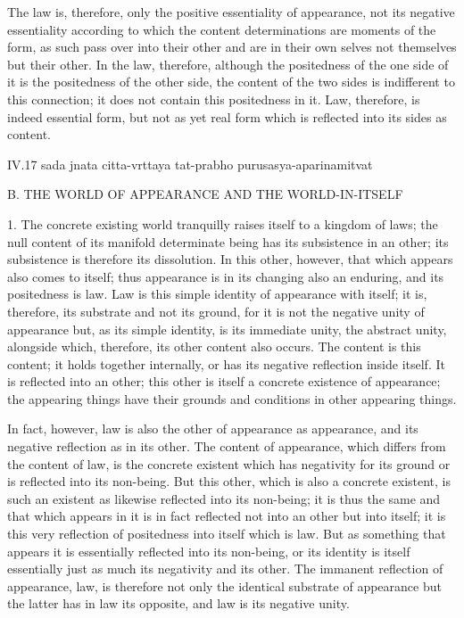 The law is, therefore, only
the positive essentiality of appearance,
not its negative essentiality according to which
the content determinations are moments of the form,
as such pass over into their other
and are in their own selves
not themselves but their other.
In the law, therefore, although
the positedness of the one side of it is
the positedness of the other side,
the content of the two sides is
indifferent to this connection;
it does not contain this positedness in it.
Law, therefore, is indeed essential form,
but not as yet real form which is reflected
into its sides as content.

IV.17
sada jnata citta-vrttaya tat-prabho purusasya-aparinamitvat

B. THE WORLD OF APPEARANCE AND THE WORLD-IN-ITSELF

1. The concrete existing world tranquilly
raises itself to a kingdom of laws;
the null content of its manifold determinate being
has its subsistence in an other;
its subsistence is therefore its dissolution.
In this other, however, that which appears also comes to itself;
thus appearance is in its changing also an enduring,
and its positedness is law.
Law is this simple identity of appearance with itself;
it is, therefore, its substrate and not its ground,
for it is not the negative unity of appearance
but, as its simple identity, is its immediate unity,
the abstract unity, alongside which, therefore,
its other content also occurs.
The content is this content; it holds together internally,
or has its negative reflection inside itself.
It is reflected into an other;
this other is itself a concrete existence of appearance;
the appearing things have their grounds and conditions
in other appearing things.

In fact, however, law is also
the other of appearance as appearance,
and its negative reflection as in its other.
The content of appearance,
which differs from the content of law,
is the concrete existent
which has negativity for its ground
or is reflected into its non-being.
But this other, which is also a concrete existent,
is such an existent as likewise reflected into its non-being;
it is thus the same and that which appears in it
is in fact reflected not into an other but into itself;
it is this very reflection of positedness into itself
which is law.
But as something that appears
it is essentially reflected into its non-being,
or its identity is itself essentially
just as much its negativity and its other.
The immanent reflection of appearance,
law, is therefore not only
the identical substrate of appearance
but the latter has in law its opposite,
and law is its negative unity.

